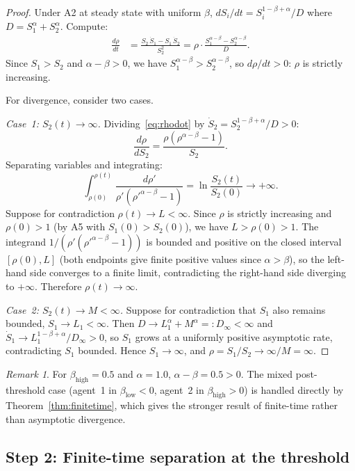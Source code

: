 \documentclass[11pt,letterpaper]{article}
\theoremstyle{plain}
\theoremstyle{definition}
\theoremstyle{remark}
\newtheorem{remark}[theorem]{Remark}
\newcommand{\betaH}{\beta_{\mathrm{high}}}
\newcommand{\betaL}{\beta_{\mathrm{low}}}
\begin{document}
\begin{proof}
Under A2 at steady state with uniform $\beta$,
$dS_i/dt = S_i^{1-\beta+\alpha}/D$ where $D = S_1^\alpha + S_2^\alpha$.
Compute:
\begin{align}
  \frac{d\rho}{dt}
  &= \frac{S_2\,\dot{S}_1 - S_1\,\dot{S}_2}{S_2^2}
   = \rho \cdot \frac{S_1^{\alpha-\beta} - S_2^{\alpha-\beta}}{D}.
  \label{eq:rhodot}
\end{align}
Since $S_1 > S_2$ and $\alpha - \beta > 0$, we have
$S_1^{\alpha-\beta} > S_2^{\alpha-\beta}$, so $d\rho/dt > 0$: $\rho$ is strictly
increasing.

For divergence, consider two cases.

\textit{Case~1: $S_2(t)\to\infty$.}
Dividing~\eqref{eq:rhodot} by $\dot{S}_2 = S_2^{1-\beta+\alpha}/D > 0$:
\[
  \frac{d\rho}{dS_2} = \frac{\rho(\rho^{\alpha-\beta}-1)}{S_2}.
\]
Separating variables and integrating:
\[
  \int_{\rho(0)}^{\rho(t)}
  \frac{d\rho'}{\rho'({\rho'}^{\alpha-\beta}-1)}
  = \ln\frac{S_2(t)}{S_2(0)} \to +\infty.
\]
Suppose for contradiction $\rho(t) \to L < \infty$.
Since $\rho$ is strictly increasing and $\rho(0) > 1$
(by A5 with $S_1(0) > S_2(0)$), we have $L > \rho(0) > 1$.
The integrand $1/(\rho'({\rho'}^{\alpha-\beta}-1))$ is bounded and positive
on the closed interval $[\rho(0), L]$ (both endpoints give finite positive
values since $\alpha > \beta$), so the left-hand side converges to a finite
limit, contradicting the right-hand side diverging to $+\infty$.
Therefore $\rho(t) \to \infty$.

\textit{Case~2: $S_2(t)\to M<\infty$.}
Suppose for contradiction that $S_1$ also remains bounded, $S_1 \to L_1 < \infty$.
Then $D \to L_1^\alpha + M^\alpha =: D_\infty < \infty$ and
$\dot{S}_1 \to L_1^{1-\beta+\alpha}/D_\infty > 0$, so $S_1$ grows at a uniformly
positive asymptotic rate, contradicting $S_1$ bounded.
Hence $S_1 \to \infty$, and $\rho = S_1/S_2 \to \infty/M = \infty$.
\end{proof}

\begin{remark}
For $\betaH = 0.5$ and $\alpha = 1.0$, $\alpha - \beta = 0.5 > 0$. \checkmark
The mixed post-threshold case (agent~1 in $\betaL < 0$, agent~2 in $\betaH > 0$)
is handled directly by Theorem~\ref{thm:finitetime}, which gives the
stronger result of finite-time rather than asymptotic divergence.
\end{remark}

\subsection{Step 2: Finite-time separation at the threshold}
\label{sec:step2}
\end{document}
